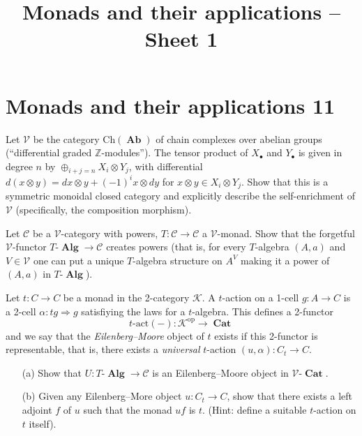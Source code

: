 \documentclass[12pt, a4paper]{article}
\date{}
\title{Monads and their applications -- Sheet 1}
\DeclareMathOperator{\op}{op}
\DeclareMathOperator{\Alg}{\mathbf{Alg}}
\DeclareMathOperator{\Cat}{\mathbf{Cat}}
\DeclareMathOperator{\Ab}{\mathbf{Ab}}
\newcommand{\ca}[1]{\mathscr{#1}}
\theoremstyle{plain}
\theoremstyle{definition}
\theoremstyle{citing}
\theoremstyle{citingdfn}
\numberwithin{equation}{section}
\begin{document}

\pagestyle{empty}
\section*{Monads and their applications 11}

\begin{question} 
 Let $\ca{V}$ be the category $\mathrm{Ch}(\Ab)$ of chain complexes over abelian groups (``differential graded $\mathbb{Z}$-modules''). The tensor product of $X_{\bullet}$ and $Y_{\bullet}$ is given in degree $n$ by $\oplus_{i+j=n} X_i \otimes Y_j$, with differential $d(x\otimes y)=dx \otimes y +(-1)^{i} x\otimes dy$ for $x\otimes y \in X_i \otimes Y_j$. Show that this is a symmetric monoidal closed category and explicitly describe the self-enrichment of $\ca{V}$ (specifically,  the composition morphism).
 \end{question}

\begin{question}
 Let $\ca{C}$ be a $\ca{V}$-category with powers, $T \colon \ca{C} \rightarrow \ca{C}$ a $\ca{V}$-monad. Show that the forgetful $\ca{V}$-functor $T\mbox{-}\Alg \rightarrow \ca{C}$ creates powers (that is, for every $T$-algebra $(A,a)$ and $V \in \ca{V}$ one can put a unique $T$-algebra structure on $A^{V}$ making it a power of $(A,a)$ in $T\mbox{-}\Alg$).
\end{question}

\begin{question}
 Let $t \colon C \rightarrow C$ be a monad in the 2-category $\ca{K}$. A $t$-action on a 1-cell $g \colon A \rightarrow C$ is a 2-cell $\alpha \colon tg \Rightarrow g$ satisfiying the laws for a $t$-algebra. This defines a 2-functor
 \[
 t\mbox{-}\mathrm{act}(-) \colon \ca{K}^{\op} \rightarrow \Cat
 \]
 and we say that the \emph{Eilenberg--Moore} object of $t$ exists if this 2-functor is representable, that is, there exists a \emph{universal} $t$-action $(u,\alpha) \colon C_t \rightarrow C$.
 
 \begin{enumerate}
 \item[(a)] Show that $U \colon T\mbox{-}\Alg \rightarrow \ca{C}$ is an Eilenberg--Moore object in $\ca{V}\mbox{-}\Cat$.
 
 \item[(b)] Given any Eilenberg--More object $u \colon C_t \rightarrow C$, show that there exists a left adjoint $f$ of $u$ such that the monad $uf$ is $t$. (Hint: define a suitable $t$-action on $t$ itself).
 \end{enumerate}
\end{question}
\end{document}
